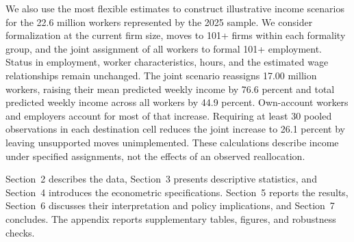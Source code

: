 We also use the most flexible estimates to construct illustrative income scenarios
for the 22.6 million workers represented by the 2025 sample. We consider
formalization at the current firm size, moves to 101+ firms within each
formality group, and the joint assignment of all workers to formal 101+
employment. Status in employment, worker characteristics, hours, and the
estimated wage relationships remain unchanged. The joint scenario reassigns
17.00 million workers, raising their mean predicted weekly income by
76.6 percent and total predicted weekly income across all workers by
44.9 percent. Own-account workers and employers account for most of that
increase. Requiring at least 30 pooled observations in each destination cell
reduces the joint increase to 26.1 percent by leaving unsupported moves
unimplemented. These calculations describe income under specified assignments,
not the effects of an observed reallocation.

Section~2 describes the data, Section~3 presents descriptive statistics, and Section~4 introduces the econometric specifications. Section~5 reports the results, Section~6 discusses their interpretation and policy implications, and Section~7 concludes. The appendix reports supplementary tables, figures, and robustness checks.
